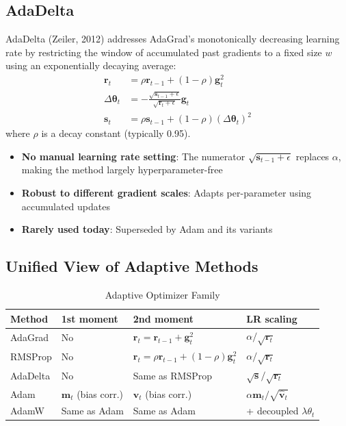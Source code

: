 \subsection{AdaDelta}

AdaDelta (Zeiler, 2012) addresses AdaGrad's monotonically decreasing learning rate by restricting the window of accumulated past gradients to a fixed size $w$ using an exponentially decaying average:
\begin{align}
\mathbf{r}_t &= \rho \mathbf{r}_{t-1} + (1 - \rho)\mathbf{g}_t^2 \\
\Delta\boldsymbol{\theta}_t &= -\frac{\sqrt{\mathbf{s}_{t-1} + \epsilon}}{\sqrt{\mathbf{r}_t + \epsilon}}\mathbf{g}_t \\
\mathbf{s}_t &= \rho \mathbf{s}_{t-1} + (1 - \rho)(\Delta\boldsymbol{\theta}_t)^2
\end{align}
where $\rho$ is a decay constant (typically 0.95).

\begin{properties}
\begin{itemize}
    \item \textbf{No manual learning rate setting}: The numerator $\sqrt{\mathbf{s}_{t-1} + \epsilon}$ replaces $\alpha$, making the method largely hyperparameter-free
    \item \textbf{Robust to different gradient scales}: Adapts per-parameter using accumulated updates
    \item \textbf{Rarely used today}: Superseded by Adam and its variants
\end{itemize}
\end{properties}

\subsection{Unified View of Adaptive Methods}

\begin{table}[ht]
    \centering
    \caption{Adaptive Optimizer Family}
    \begin{tabular}{L{2cm} L{3cm} L{3cm} L{3.5cm}}
        \toprule
        \textbf{Method} & \textbf{1st moment} & \textbf{2nd moment} & \textbf{LR scaling} \\
        \midrule
        AdaGrad & No & $\mathbf{r}_t = \mathbf{r}_{t-1} + \mathbf{g}_t^2$ & $\alpha / \sqrt{\mathbf{r}_t}$ \\
        RMSProp & No & $\mathbf{r}_t = \rho\mathbf{r}_{t-1} + (1-\rho)\mathbf{g}_t^2$ & $\alpha / \sqrt{\mathbf{r}_t}$ \\
        AdaDelta & No & Same as RMSProp & $\sqrt{\mathbf{s}} / \sqrt{\mathbf{r}_t}$ \\
        Adam & $\mathbf{m}_t$ (bias corr.) & $\mathbf{v}_t$ (bias corr.) & $\alpha \hat{\mathbf{m}}_t / \sqrt{\hat{\mathbf{v}}_t}$ \\
        AdamW & Same as Adam & Same as Adam & + decoupled $\lambda\theta_t$ \\
        \bottomrule
    \end{tabular}
\end{table}

